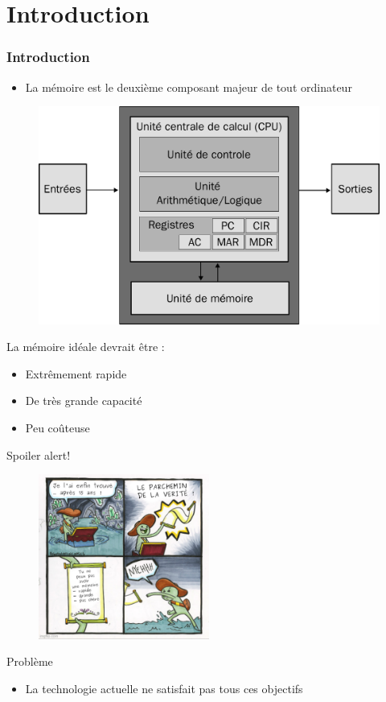 \documentclass[8pt]{beamer}
\begin{document}
\section*{Introduction}
\begin{frame}
    \frametitle{Introduction}
    \begin{itemize}
        \item La mémoire est le deuxième composant majeur de tout ordinateur
    \end{itemize}
    \begin{figure}
        \centering

        \includegraphics[width=.45\textwidth]{figures/Von-Neumann-Architecture-Diagram.pdf}
        \label{fig:sub1}
    \end{figure}
    \begin{block}{La mémoire idéale devrait être :}
        \begin{itemize}
            \item Extrêmement rapide
            \item De très grande capacité
            \item Peu coûteuse
        \end{itemize}
    \end{block}

\end{frame}

\begin{frame}{Spoiler alert!}
    \begin{figure}
        \centering
        \includegraphics[width=0.5\textwidth]{figures/meme.png}
        \label{fig:memory_speed}
    \end{figure}

    \begin{alertblock}{Problème}
        \begin{itemize}
            \item La technologie actuelle ne satisfait pas tous ces objectifs
        \end{itemize}
    \end{alertblock}
\end{frame}
\end{document}
